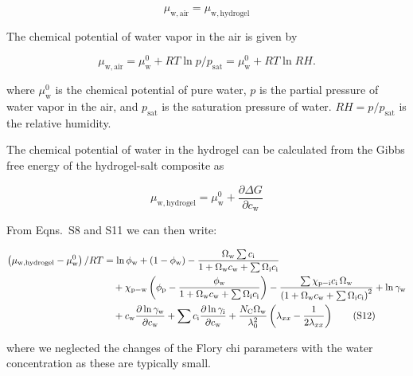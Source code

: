 \documentclass[11pt]{article}
\begin{document}
\begin{equation}
\mu_\mathrm{w,air} = \mu_\mathrm{w,hydrogel} \tag{S9}
\end{equation}

The chemical potential of water vapor in the air is given by\cite{atkins2006}

\begin{equation}
\mu_\mathrm{w,air} = \mu_\mathrm{w}^0 + RT \ln p/p_\mathrm{sat} = \mu_\mathrm{w}^0 + RT \ln RH. \tag{S10}
\end{equation}

where $\mu_\mathrm{w}^0$ is the chemical potential of pure water, $p$ is the partial pressure of water vapor in the air, and $p_\mathrm{sat}$ is the saturation pressure of water. $RH = p/p_\mathrm{sat}$ is the relative humidity.

The chemical potential of water in the hydrogel can be calculated from the Gibbs free energy of the hydrogel-salt composite as\cite{atkins2006}

\begin{equation}
\mu_\mathrm{w,hydrogel} = \mu_\mathrm{w}^0 + \frac{\partial \Delta G}{\partial c_\mathrm{w}} \tag{S11}
\end{equation}

From Eqns.~S8 and S11 we can then write:

\begin{align}
\left(\mu_\mathrm{w,hydrogel} - \mu_\mathrm{w}^0\right)/RT
&= \ln \phi_\mathrm{w} + \left(1 - \phi_\mathrm{w}\right) - \frac{\Omega_\mathrm{w} \sum c_\mathrm{i}}{1 + \Omega_\mathrm{w} c_\mathrm{w} + \sum \Omega_\mathrm{i} c_\mathrm{i}} \notag\\
&\quad + \chi_\mathrm{p-w}\left(\phi_\mathrm{p} - \frac{\phi_\mathrm{w}}{1 + \Omega_\mathrm{w} c_\mathrm{w} + \sum \Omega_\mathrm{i} c_\mathrm{i}}\right) - \frac{\sum \chi_\mathrm{p-i} c_\mathrm{i}\, \Omega_\mathrm{w}}{\left(1 + \Omega_\mathrm{w} c_\mathrm{w} + \sum \Omega_\mathrm{i} c_\mathrm{i}\right)^2} + \ln \gamma_\mathrm{w} \notag\\
&\quad + c_\mathrm{w} \frac{\partial \ln \gamma_\mathrm{w}}{\partial c_\mathrm{w}} + \sum c_\mathrm{i} \frac{\partial \ln \gamma_\mathrm{i}}{\partial c_\mathrm{w}} + \frac{N_\mathrm{C} \Omega_\mathrm{w}}{\lambda_0^2}\left(\lambda_{xx} - \frac{1}{2\lambda_{xx}}\right) \tag{S12}
\end{align}

where we neglected the changes of the Flory chi parameters with the water concentration as these are typically small.\cite{graeber2023}
\end{document}
